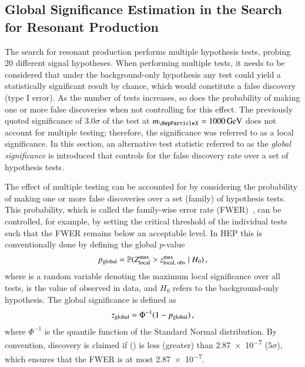 
\subsection{Global Significance Estimation in the Search for Resonant \HH
  Production}%
\label{sec:global_significance}

The search for resonant \HH production performs multiple hypothesis tests,
probing 20 different signal hypotheses. When performing multiple tests, it needs
to be considered that under the background-only hypothesis any test could yield
a statistically significant result by chance, which would constitute a false
discovery (type I error). As the number of tests increases, so does the
probability of making one or more false discoveries when not controlling for
this effect. The previously quoted significance of $3.0\sigma$ of the test at
$\mX = \SI{1000}{\GeV}$ does not account for multiple testing; therefore, the
significance was referred to as a local significance. In this section, an
alternative test statistic referred to as the \emph{global significance} is
introduced that controls for the false discovery rate over a set of hypothesis
tests.

The effect of multiple testing can be accounted for by considering the
probability of making one or more false discoveries over a set (family) of
hypothesis tests. This probability, which is called the family-wise error rate
(FWER)~\cite{lehmann2005testing}, can be controlled, for example, by setting the
critical threshold of the individual tests such that the FWER remains below an
acceptable level. In HEP this is conventionally done by defining the global
$p$-value
\begin{align*}
  p_{\text{global}} = \mathbb{P}( Z_{\text{local}}^{\text{max}} > z_{\text{local, obs}}^{\text{max}} \mid H_0 )\,\text{,}
\end{align*}
where \Zmaxlocal is a random variable denoting the maximum local significance
over all tests, \zmaxlocalobs is the value of \Zmaxlocal observed in data, and
$H_0$ refers to the background-only hypothesis. The global significance is
defined as
\begin{align*}
  z_{\text{global}} = \Phi^{-1}(1 - p_{\text{global}}) \,\text{,}
\end{align*}
where $\Phi^{-1}$ is the quantile function of the Standard Normal
distribution. By convention, discovery is claimed if \pglobal (\zglobal) is less
(greater) than \num{2.87e-7} ($5\sigma$), which ensures that the FWER is at most
\num{2.87e-7}.

